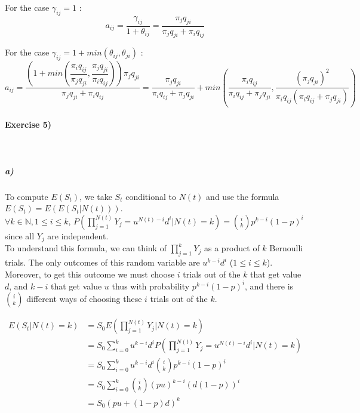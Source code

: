 \documentclass{article}
\begin{document}
For the case $\gamma_{ij}=1$ :\\
$$a_{ij}=\dfrac{\gamma_{ij}}{1+ \theta_{ij}}=\dfrac{\pi_j q_{ji}}{\pi_j q_{ji}+\pi_i q_{ij}}$$

For the case $\gamma_{ij}=1+min(\theta_{ij},\theta_{ji})$ :\\
$$a_{ij}=\dfrac{\left(1+min(\dfrac{\pi_i q_{ij}}{\pi_j q_{ji}},\dfrac{\pi_j q_{ji}}{\pi_i q_{ij}})\right)\pi_j q_{ji}}{\pi_j q_{ji}+\pi_i q_{ij}}=\dfrac{\pi_j q_{ji}}{\pi_i q_{ij}+\pi_j q_{ji}}+min\left(  \dfrac{\pi_i q_{ij}}{\pi_i q_{ij}+\pi_j q_{ji}},\dfrac{(\pi_j q_{ji})^2}{\pi_i q_{ij}(\pi_i q_{ij}+\pi_j q_{ji})}\right)$$ 


\paragraph{Exercise 5)}
\
\subparagraph{a)}
To compute $E(S_t)$, we take $S_t$ conditional to $N(t)$ and use the formula $E(S_t)=E(E(S_t|N(t)))$. \\

$\forall k \in \mathbb{N}, 1 \leq i \leq k$,
 $P \left(\prod_{j=1}^{N(t)}Y_j=u^{N(t)-i} d^i|N(t)=k  \right)=\binom{i}{k} p^{k-i}(1-p)^i$
 since all $Y_j$ are independent. \\
 
 To understand this formula, we can think of $\prod_{j=1}^{k} Y_j $ as a product of $k$ Bernoulli trials. The only outcomes of this random variable are 
 $u^{k-i} d^i$ ($ 1 \leq i \leq k$). Moreover, to get this outcome we must choose $i$ trials out of the $k$ that get value $d$, and $k-i$ that get value $u$ thus with probability $p^{k-i}(1-p)^i$, and there is $\binom{i}{k}$ different ways of choosing these $i$ trials out of the $k$.
 
 \begin{align*}
 \displaystyle E(S_t|N(t)=k) &= S_0E(\prod_{j=1}^{N(t)}Y_j|N(t)=k) \\
 &=S_0\sum_{i=0}^k u^{k-i} d^i P\left(\prod_{j=1}^{N(t)}Y_j=u^{N(t)-i} d^i|N(t)=k\right)  \\
 &= S_0 \sum_{i=0}^k u^{k-i} d^i \binom{i}{k}p^{k-i}(1-p)^i \\
 &= S_0 \sum_{i=0}^k \binom{i}{k} (pu)^{k-i} (d(1-p))^i  \\
 &= S_0 (pu+(1-p)d)^k
\end{align*}
\end{document}

